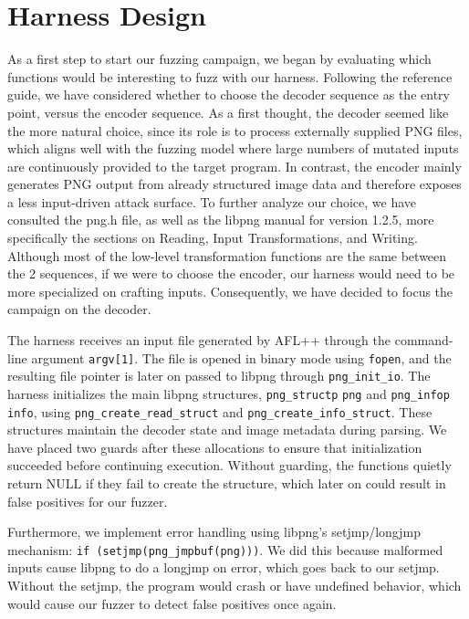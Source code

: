 \section{Harness Design}
 As a first step to start our fuzzing campaign, we began by evaluating which functions would be interesting to fuzz with our harness. Following the reference guide\cite{fuzzing_exercise}, we have considered whether to choose the decoder sequence as the entry point, versus the encoder sequence. As a first thought, the decoder seemed like the more natural choice, since its role is to process externally supplied PNG files, which aligns well with the fuzzing model where large numbers of mutated inputs are continuously provided to the target program. In contrast, the encoder mainly generates PNG output from already structured image data and therefore exposes a less input-driven attack surface. To further analyze our choice, we have consulted the png.h file, as well as the libpng manual for version 1.2.5\cite{libpng_manual}, more specifically the sections on Reading, Input Transformations, and Writing. Although most of the low-level transformation functions are the same between the 2 sequences, if we were to choose the encoder, our harness would need to be more specialized on crafting inputs. Consequently, we have decided to focus the campaign on the decoder. 

The harness receives an input file generated by AFL++ through the command-line argument \texttt{argv[1]}. The file is opened in binary mode using \texttt{fopen}, and the resulting file pointer is later on passed to libpng through \texttt{png\_init\_io}. The harness initializes the main libpng structures, \texttt{png\_structp} \texttt{png} and \texttt{png\_infop} \texttt{info}, using \texttt{png\_create\_read\_struct} and \texttt{png\_create\_info\_struct}. These structures maintain the decoder state and image metadata during parsing. We have placed two guards after these allocations to ensure that initialization succeeded before continuing execution. Without guarding, the functions quietly return NULL if they fail to create the structure, which later on could result in false positives for our fuzzer.

Furthermore, we implement error handling using libpng’s setjmp/longjmp mechanism: \texttt{if (setjmp(png\_jmpbuf(png)))}. We did this because malformed inputs cause libpng to do a longjmp on error, which goes back to our setjmp. Without the setjmp, the program would crash or have undefined behavior, which would cause our fuzzer to detect false positives once again.

